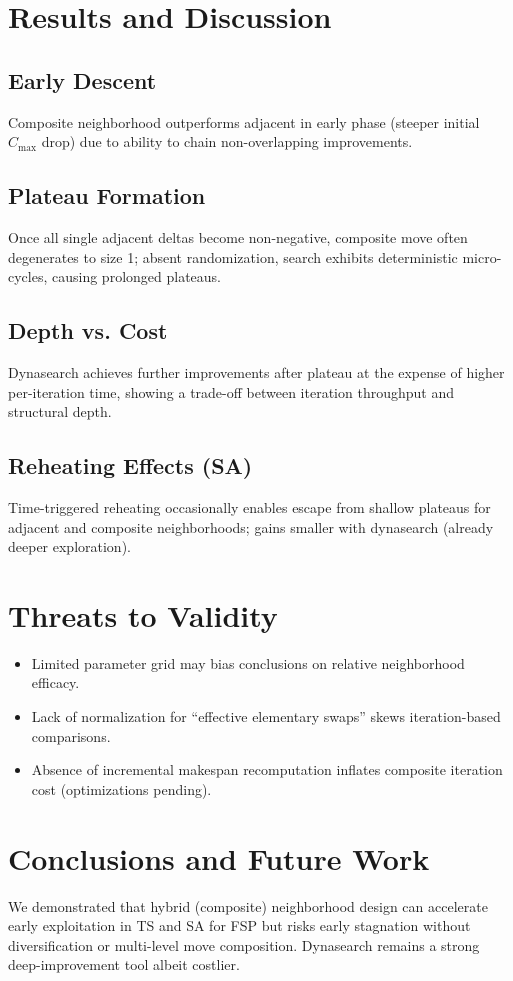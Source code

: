 \documentclass[runningheads]{llncs}
\begin{document}
\section{Results and Discussion}
\subsection{Early Descent}
Composite neighborhood outperforms adjacent in early phase (steeper initial $C_{\max}$ drop) due to ability to chain non-overlapping improvements.

\subsection{Plateau Formation}
Once all single adjacent deltas become non-negative, composite move often degenerates to size 1; absent randomization, search exhibits deterministic micro-cycles, causing prolonged plateaus.

\subsection{Depth vs. Cost}
Dynasearch achieves further improvements after plateau at the expense of higher per-iteration time, showing a trade-off between iteration throughput and structural depth.

\subsection{Reheating Effects (SA)}
Time-triggered reheating occasionally enables escape from shallow plateaus for adjacent and composite neighborhoods; gains smaller with dynasearch (already deeper exploration).

\section{Threats to Validity}
\begin{itemize}
  \item Limited parameter grid may bias conclusions on relative neighborhood efficacy.
  \item Lack of normalization for ``effective elementary swaps'' skews iteration-based comparisons.
  \item Absence of incremental makespan recomputation inflates composite iteration cost (optimizations pending).
\end{itemize}

\section{Conclusions and Future Work}
We demonstrated that hybrid (composite) neighborhood design can accelerate early exploitation in TS and SA for FSP but risks early stagnation without diversification or multi-level move composition. Dynasearch remains a strong deep-improvement tool albeit costlier.
\end{document}
